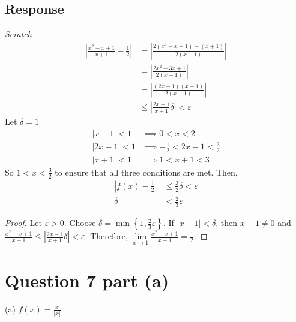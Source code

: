 \documentclass[13pt]{article}
\begin{document}
\subsection*{Response}
\textit{Scratch} \\
\begin{align*}
  \left| \frac{x^2 - x + 1}{x + 1} - \frac{1}{2} \right|
  &= \left| \frac{2(x^2 - x + 1) - (x + 1)}{2(x + 1)} \right| \\
  &= \left| \frac{2x^2 - 3x + 1}{2(x + 1)} \right| \\
  &= \left| \frac{(2x - 1)(x - 1)}{2(x + 1)} \right| \\
  &\leq \left| \frac{2x - 1}{x + 1} \delta \right| < \varepsilon
\end{align*}
Let $\delta = 1$
\begin{align*}
  |x - 1| < 1 &\implies 0 < x < 2 \\
  |2x - 1| < 1 &\implies -\frac{1}{2} < 2x - 1 < \frac{3}{2} \\
  |x + 1| < 1 &\implies 1 < x + 1 < 3              
\end{align*}
So $1 < x < \frac{3}{2}$ to ensure that all three conditions are met. Then,
\begin{align*}
  \left| f(x) - \frac{1}{2} \right| &\leq \frac{3}{2} \delta <
                                      \varepsilon \\
  \delta &< \frac{2}{3} \varepsilon
\end{align*}
\begin{proof}
  Let $\varepsilon > 0$. Choose $\delta = \min\left\{ 1,
    \frac{2}{3}\varepsilon \right\}$. If $|x - 1| < \delta$, then $x +
  1 \neq 0$ and 
  $\frac{x^2 - x + 1}{x + 1} \leq \left| \frac{2x - 1}{x + 1} \delta
  \right| < \varepsilon$. Therefore, $\lim\limits_{x \to 1} \frac{x^2 - x +
    1}{x + 1} = \frac{1}{2}$. 
\end{proof}

\newpage
\section*{Question 7 part (a)}
(a) $f(x) = \frac{x}{|x|}$
\end{document}
